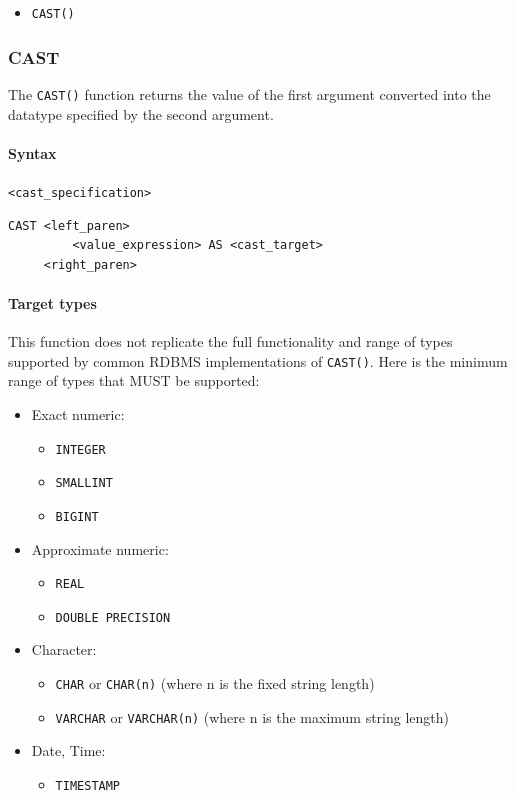 \documentclass[11pt,a4paper]{ivoa}
\begin{document}
\begin{itemize}
    \item \verb:CAST():
\end{itemize}

\subsubsection{CAST}
\label{sec:type.cast}

The \verb:CAST(): function returns the value of the first argument converted
into the datatype specified by the second argument.

\paragraph{Syntax} \verb:<cast_specification>:
\begin{verbatim}
CAST <left_paren>
         <value_expression> AS <cast_target>
     <right_paren>
\end{verbatim}

\paragraph{Target types}

This function does not replicate the full functionality and range of types
supported by common RDBMS implementations of \verb:CAST():. Here is the minimum
range of types that MUST be supported:

\begin{itemize}
    \item Exact numeric:
    \begin{itemize}
        \item \verb:INTEGER:
        \item \verb:SMALLINT:
        \item \verb:BIGINT:
    \end{itemize}
    \item Approximate numeric:
    \begin{itemize}
        \item \verb:REAL:
        \item \verb:DOUBLE PRECISION:
    \end{itemize}
    \item Character:
    \begin{itemize}
        \item \verb:CHAR: or \verb:CHAR(n): (where n is the fixed string length)
        \item \verb:VARCHAR: or \verb:VARCHAR(n): (where n is the maximum string length)
    \end{itemize}
    \item Date, Time:
    \begin{itemize}
        \item \verb:TIMESTAMP:
    \end{itemize}
\end{itemize}
\end{document}

